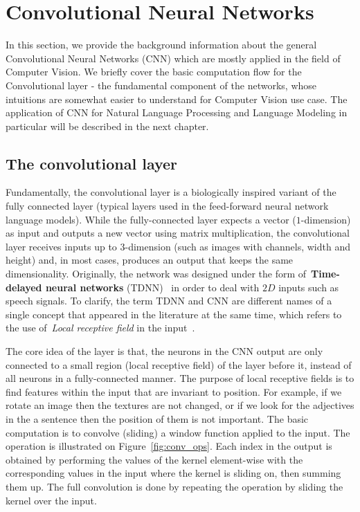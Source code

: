 

\section{Convolutional Neural Networks}

In this section, we provide the background information about the general Convolutional Neural Networks (CNN) which are mostly applied in the field of Computer Vision. We briefly cover the basic 
computation flow for the Convolutional layer - the fundamental component of the networks, whose intuitions are somewhat easier to understand for Computer Vision use case. The application of CNN for 
Natural Language Processing and Language Modeling in particular will be described in the next chapter.


\subsection{The convolutional layer}

Fundamentally, the convolutional layer is a biologically inspired variant of the fully connected layer (typical layers used in the feed-forward neural network language models). While the fully-connected layer expects a vector ($1$-dimension) as input and outputs a new vector using matrix multiplication, the convolutional layer receives inputs up to $3$-dimension (such as images with channels, width and height) and, in most cases, produces an output that keeps the same dimensionality. Originally, the network was designed under the form of~\textbf{Time-delayed neural networks} (TDNN)~\cite{waibel1989phoneme} in order to deal with $2D$ inputs such as speech signals. To clarify, the term TDNN and CNN are different names of a single concept that appeared in the literature at the same time, which refers to the use of~\textit{Local receptive field} in the input~\cite{fukushima1980neocognitron,serre2007robust}. 

The core idea of the layer is that, the neurons in the CNN output are only connected to a small region (local receptive field) of the layer before it, instead of all neurons in a fully-connected manner. The purpose of local receptive fields is to find features within the input that are invariant to position. For example, if we rotate an image then the textures are not changed, or if we look for the adjectives in the a sentence then the position of them is not important. The basic computation is to convolve (sliding) a window function applied to the input. The operation is illustrated on Figure~\ref{fig:conv_ops}. Each index in the output is obtained by performing the values of the kernel element-wise with the corresponding values in the input where the kernel is sliding on, then summing them up. The full convolution is done by repeating the operation by sliding the kernel over the input.


